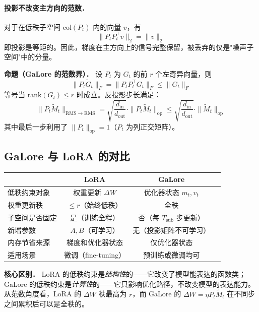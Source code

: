 \documentclass[12pt, a4paper]{article}
\newcommand{\RMS}{\mathrm{RMS}}
\newcommand{\op}{\mathrm{op}}
\begin{document}
\paragraph{投影不改变主方向的范数．}
对于在低秩子空间 $\mathrm{col}(P_t)$ 内的向量 $v$，有
\[
  \|P_t P_t^\top v\|_2 = \|v\|_2
\]
即投影是等距的。因此，梯度在主方向上的信号完整保留，被丢弃的仅是"噪声子空间"中的分量。

\begin{propbox}
\textbf{命题（GaLore 的范数界）．}
设 $P_t$ 为 $G_t$ 的前 $r$ 个左奇异向量，则
\[
  \|P_t \tilde{G}_t\|_F = \|P_t P_t^\top G_t\|_F \leq \|G_t\|_F
\]
等号当 $\mathrm{rank}(G_t) \leq r$ 时成立。反投影步长满足：
\[
  \|P_t \tilde{M}_t\|_{\RMS\to\RMS}
  = \sqrt{\frac{d_{\mathrm{in}}}{d_{\mathrm{out}}}} \cdot \|P_t \tilde{M}_t\|_{\op}
  \leq \sqrt{\frac{d_{\mathrm{in}}}{d_{\mathrm{out}}}} \cdot \|\tilde{M}_t\|_{\op}
\]
其中最后一步利用了 $\|P_t\|_{\op} = 1$（$P_t$ 为列正交矩阵）。
\end{propbox}

\subsection{GaLore 与 LoRA 的对比}

\begin{center}
\begin{tabular}{lccc}
\toprule
 & LoRA & GaLore \\
\midrule
低秩约束对象   & 权重更新 $\Delta W$ & 优化器状态 $m_t, v_t$ \\
权重更新秩     & $\leq r$（始终低秩） & 全秩 \\
子空间是否固定 & 是（训练全程） & 否（每 $T_{\mathrm{sub}}$ 步更新） \\
新增参数       & $A, B$（可学习） & 无（投影矩阵不可学习） \\
内存节省来源   & 梯度和优化器状态 & 仅优化器状态 \\
适用场景       & 微调（fine-tuning） & 预训练或微调均可 \\
\bottomrule
\end{tabular}
\end{center}

\begin{rembox}
\textbf{核心区别．} LoRA 的低秩约束是\emph{结构性}的——它改变了模型能表达的函数类；
GaLore 的低秩约束是\emph{计算性}的——它只影响优化路径，不改变模型的表达能力。
从范数角度看，LoRA 的 $\Delta W$ 秩最高为 $r$，而 GaLore 的 $\Delta W = \eta P_t \tilde{M}_t$
在不同步之间累积后可以是全秩的。
\end{rembox}
\end{document}
